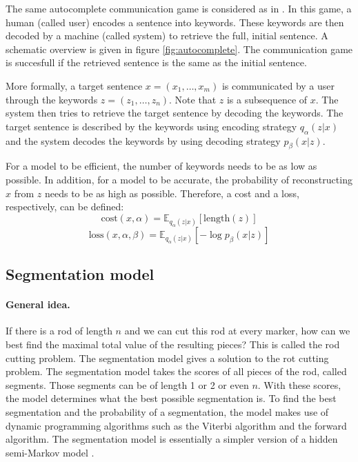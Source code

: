 The same autocomplete communication game is considered as in . In this game, a human (called user) encodes a sentence into keywords. 
These keywords are then decoded by a machine (called system) to retrieve the full, initial sentence. 
A schematic overview is given in figure \ref{fig:autocomplete}. 
The communication game is succesfull if the retrieved sentence is the same as the initial sentence. 

More formally, a target sentence $x=(x_1, \dots, x_m)$ is communicated by a user through the keywords $z=(z_1, \dots, z_n)$. 
Note that $z$ is a subsequence of $x$. 
The system then tries to retrieve the target sentence by decoding the keywords. 
The target sentence is described by the keywords using encoding strategy $q_{\alpha}(z | x)$ and the system decodes the keywords by using decoding strategy $p_{\beta}(x|z)$. 

For a model to be efficient, the number of keywords needs to be as low as possible. 
In addition, for a model to be accurate, the probability of reconstructing $x$ from $z$ needs to be as high as possible. 
Therefore, a cost and a loss, respectively, can be defined:
\begin{equation}
    \label{eq:cost}
    \text{cost}(x,\alpha) = \mathbb{E}_{q_{\alpha}(z|x)} [\text{length}(z)]
\end{equation}
\begin{equation}
    \label{eq:loss}
    \text{loss}(x,\alpha,\beta) = \mathbb{E}_{q_{\alpha}(z|x)} [-\log p_{\beta}(x|z)]
\end{equation}

\subsection{Segmentation model}
\label{sec:segmentation}

\paragraph{General idea.}
If there is a rod of length $n$ and we can cut this rod at every marker, how can we best find the maximal total value of the resulting pieces?
This is called the rod cutting problem.
The segmentation model gives a solution to the rot cutting problem. 
The segmentation model takes the scores of all pieces of the rod, called segments. 
Those segments can be of length 1 or 2 or even $n$. 
With these scores, the model determines what the best possible segmentation is. 
To find the best segmentation and the probability of a segmentation, the model makes use of dynamic programming algorithms such as the Viterbi algorithm \cite{Viterbi} and the forward algorithm.
The segmentation model is essentially a simpler version of a hidden semi-Markov model \cite{hsmms}. 


